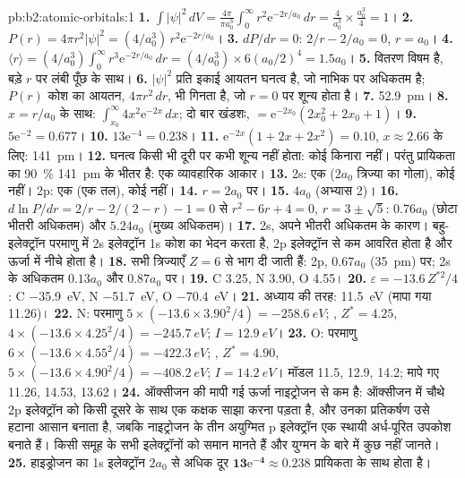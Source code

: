 \begin{solution}{pb:b2:atomic-orbitals:1}
\textbf{1.} $\int|\psi|^2\,dV = \frac{4\pi}{\pi a_0^3}\int_0^\infty r^2\mathrm e^{-2r/a_0}\,dr =
\frac{4}{a_0^3} \times \frac{a_0^3}{4} = 1$।
\textbf{2.} $P(r) = 4\pi r^2|\psi|^2 = (4/a_0^3)\,r^2\mathrm e^{-2r/a_0}$।
\textbf{3.} $dP/dr = 0$: $2/r - 2/a_0 = 0$, $r = a_0$।
\textbf{4.} $\langle r\rangle = (4/a_0^3)\int_0^\infty r^3\mathrm e^{-2r/a_0}\,dr = (4/a_0^3)
\times 6(a_0/2)^4 = 1.5a_0$।
\textbf{5.} वितरण विषम है, बड़े $r$ पर लंबी पूँछ के साथ।
\textbf{6.} $|\psi|^2$ प्रति इकाई आयतन घनत्व है, जो नाभिक पर अधिकतम है; $P(r)$
कोश का आयतन, $4\pi r^2\,dr$, भी गिनता है, जो $r = 0$ पर शून्य होता है।
\textbf{7.} \qty{52.9}{pm}।
\textbf{8.} $x = r/a_0$ के साथ: $\int_{x_0}^\infty 4x^2\mathrm e^{-2x}\,dx$; दो बार खंडशः,
$= \mathrm e^{-2x_0}(2x_0^2 + 2x_0 + 1)$।
\textbf{9.} $5\mathrm e^{-2} = 0.677$।
\textbf{10.} $13\mathrm e^{-4} = 0.238$।
\textbf{11.} $\mathrm e^{-2x}(1 + 2x + 2x^2) = 0.10$, $x \approx 2.66$ के लिए: \qty{141}{pm}।
\textbf{12.} घनत्व किसी भी दूरी पर कभी शून्य नहीं होता: कोई किनारा नहीं। परंतु
प्रायिकता का 90~\% \qty{141}{pm} के भीतर है: एक व्यावहारिक आकार।
\textbf{13.} 2s: एक  ($2a_0$ त्रिज्या का गोला), कोई  नहीं। 2p: एक
 (एक तल), कोई  नहीं।
\textbf{14.} $r = 2a_0$ पर।
\textbf{15.} $4a_0$ (अभ्यास 2)।
\textbf{16.} $d\ln P/dr = 2/r - 2/(2 - r) - 1 = 0$ से $r^2 - 6r + 4 = 0$, $r = 3 \pm \sqrt5$:
$0.76a_0$ (छोटा भीतरी अधिकतम) और $5.24a_0$ (मुख्य अधिकतम)।
\textbf{17.} 2s, अपने भीतरी अधिकतम के कारण। बहु-इलेक्ट्रॉन परमाणु में 2s इलेक्ट्रॉन
1s कोश का भेदन करता है, 2p इलेक्ट्रॉन से कम आवरित होता है और ऊर्जा में
नीचे होता है।
\textbf{18.} सभी त्रिज्याएँ $Z = 6$ से भाग दी जाती हैं: 2p, $0.67a_0$ (\qty{35}{pm}) पर; 2s के अधिकतम
$0.13a_0$ और $0.87a_0$ पर।
\textbf{19.} C 3.25, N 3.90, O 4.55।
\textbf{20.} $\varepsilon = -13.6\,Z^{*2}/4$: C \qty{-35.9}{eV}, N \qty{-51.7}{eV}, O
\qty{-70.4}{eV}।
\textbf{21.} अध्याय की तरह: \qty{11.5}{eV} (मापा गया 11.26)।
\textbf{22.} N: परमाणु $5 \times (-13.6 \times 3.90^2/4) = \qty{-258.6}{eV}$; , $Z^* =
4.25$, $4 \times (-13.6 \times 4.25^2/4) = \qty{-245.7}{eV}$; $I = \qty{12.9}{eV}$।
\textbf{23.} O: परमाणु $6 \times (-13.6 \times 4.55^2/4) = \qty{-422.3}{eV}$; , $Z^* =
4.90$, $5 \times (-13.6 \times 4.90^2/4) = \qty{-408.2}{eV}$; $I = \qty{14.2}{eV}$। मॉडल
11.5, 12.9, 14.2; मापे गए 11.26, 14.53, 13.62।
\textbf{24.} ऑक्सीजन की मापी गई ऊर्जा नाइट्रोजन से कम है: ऑक्सीजन में
चौथे 2p इलेक्ट्रॉन को किसी दूसरे के साथ एक कक्षक साझा करना पड़ता है, और उनका
प्रतिकर्षण उसे हटाना आसान बनाता है, जबकि नाइट्रोजन के तीन अयुग्मित p इलेक्ट्रॉन
एक स्थायी अर्ध-पूरित उपकोश बनाते हैं।  किसी समूह के सभी इलेक्ट्रॉनों को
समान मानते हैं और युग्मन के बारे में कुछ नहीं जानते।
\textbf{25.} हाइड्रोजन का 1s इलेक्ट्रॉन $2a_0$ से अधिक दूर
$\boldsymbol{13\mathrm e^{-4} \approx 0.238}$ प्रायिकता के साथ होता है।
\end{solution}
